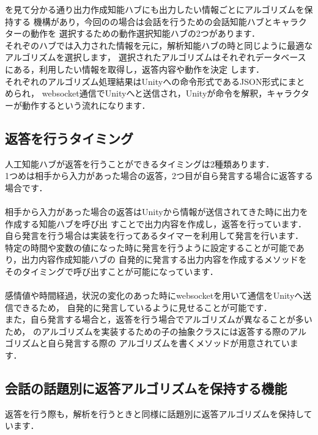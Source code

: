 
を見て分かる通り出力作成知能ハブにも出力したい情報ごとにアルゴリズムを保持する
機構があり，今回のの場合は会話を行うための会話知能ハブとキャラクターの動作を
選択するための動作選択知能ハブの2つがあります．\\

それぞのハブでは入力された情報を元に，解析知能ハブの時と同じように最適なアルゴリズムを選択します，
選択されたアルゴリズムはそれぞれデータベースにある，利用したい情報を取得し，返答内容や動作を決定
します．\\

それぞれのアルゴリズム処理結果はUnityへの命令形式であるJSON形式にまとめられ，
websocket通信でUnityへと送信され，Unityが命令を解釈，キャラクターが動作するという流れになります．


\subsection{返答を行うタイミング}
人工知能ハブが返答を行うことができるタイミングは2種類あります．\\
1つめは相手から入力があった場合の返答，2つ目が自ら発言する場合に返答する場合です．\\
\\
相手から入力があった場合の返答はUnityから情報が送信されてきた時に出力を作成する知能ハブを呼び出
すことで出力内容を作成し，返答を行っています．\\

自ら発言を行う場合は実装を行ってあるタイマーを利用して発言を行います．
特定の時間や変数の値になった時に発言を行うように設定することが可能であり，出力内容作成知能ハブの
自発的に発言する出力内容を作成するメソッドをそのタイミングで呼び出すことが可能になっています．\\
\\
感情値や時間経過，状況の変化のあった時にwebsocketを用いて通信をUnityへ送信できるため，
自発的に発言しているように見せることが可能です．\\

また，自ら発言する場合と，返答を行う場合でアルゴリズムが異なることが多いため，
のアルゴリズムを実装するための子の抽象クラスには返答する際のアルゴリズムと自ら発言する際の
アルゴリズムを書くメソッドが用意されています．\\

\subsection{会話の話題別に返答アルゴリズムを保持する機能}
返答を行う際も，解析を行うときと同様に話題別に返答アルゴリズムを保持しています．\\

